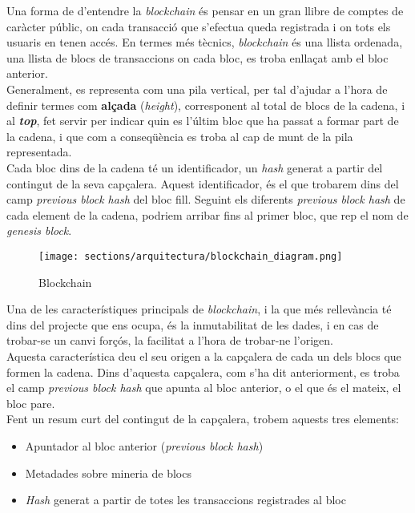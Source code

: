 Una forma de d’entendre la \textit{blockchain}\cite{blockchain} és pensar en un gran llibre de comptes de caràcter públic, on cada transacció que s’efectua queda registrada i on tots els usuaris en tenen accés.
En termes més tècnics, \textit{blockchain} és una llista ordenada, una llista de blocs de transaccions on cada bloc, es troba enllaçat amb el bloc anterior.\\
\newline Generalment, es representa com una pila vertical, per tal d’ajudar a l’hora de definir termes com \textbf{alçada} (\textit{height}), corresponent al total de blocs de la cadena, i al \textbf{\textit{top}}, fet servir per indicar quin es l'últim bloc que ha passat a formar part de la cadena, i que com a conseqüència es troba al cap de munt de la pila representada.\\
\newline Cada bloc dins de la cadena té un identificador, un \textit{hash} generat a partir del contingut de la seva capçalera. Aquest identificador, és el que trobarem dins del camp \textit{previous block hash} del bloc fill.
Seguint els diferents \textit{previous block hash}  de cada element de la cadena, podriem arribar fins al primer bloc, que rep el nom de \textit{genesis block}.\\
\begin{wrapfigure}{r}{0.25\textwidth}
\texttt{[image: sections/arquitectura/blockchain\_diagram.png]}
\caption{Blockchain}
\label{fig:blockchain}
\end{wrapfigure}
\newline Una de les característiques principals de \textit{blockchain}, i la que més rellevància té dins del projecte que ens ocupa, és la inmutabilitat de les dades, i en cas de trobar-se un canvi forçós, la facilitat a l’hora de trobar-ne l’origen.\\
\newline Aquesta característica deu el seu origen a la capçalera de cada un dels blocs que formen la cadena.
Dins d’aquesta capçalera, com s'ha dit anteriorment, es troba el camp \textit{previous block hash} que apunta al bloc  anterior, o el que és el mateix, el bloc pare.\\
\newline Fent un resum curt del contingut de la capçalera, trobem aquests tres elements:
\begin{itemize}
    \item Apuntador al bloc anterior (\textit{previous block hash})
    \item Metadades sobre mineria de blocs
    \item \textit{Hash} generat a partir de totes les transaccions registrades al bloc
\end{itemize}

